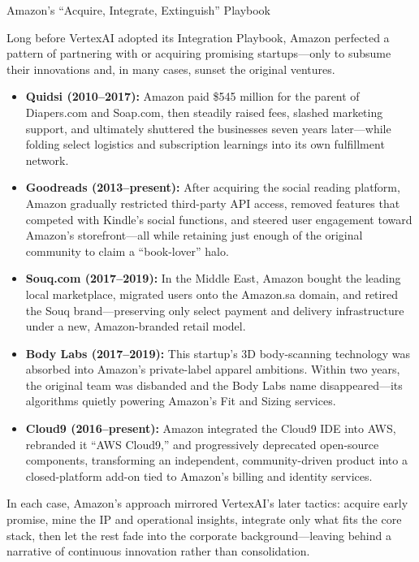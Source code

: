 \begin{HistoricalSidebar}{Amazon’s “Acquire, Integrate, Extinguish” Playbook}

  Long before VertexAI adopted its Integration Playbook, Amazon perfected a pattern of partnering with or acquiring 
  promising startups—only to subsume their innovations and, in many cases, sunset the original ventures.

  \medskip
  
  \begin{itemize}

    \item \textbf{Quidsi (2010–2017):}  Amazon paid \$545 million for the parent of Diapers.com and Soap.com, then 
    steadily raised fees, slashed marketing support, and ultimately shuttered the businesses seven years later—while 
    folding select logistics and subscription learnings into its own fulfillment network.

    \medskip

    \item \textbf{Goodreads (2013–present):}  After acquiring the social reading platform, Amazon gradually restricted 
    third-party API access, removed features that competed with Kindle’s social functions, and steered user engagement 
    toward Amazon’s storefront—all while retaining just enough of the original community to claim a “book-lover” halo.

    \medskip

    \item \textbf{Souq.com (2017–2019):}  In the Middle East, Amazon bought the leading local marketplace, migrated 
    users onto the Amazon.sa domain, and retired the Souq brand—preserving only select payment and delivery 
    infrastructure under a new, Amazon-branded retail model.

    \medskip

    \item \textbf{Body Labs (2017–2019):}  This startup’s 3D body-scanning technology was absorbed into Amazon’s 
    private-label apparel ambitions.  Within two years, the original team was disbanded and the Body Labs name 
    disappeared—its algorithms quietly powering Amazon’s Fit and Sizing services.

    \medskip

    \item \textbf{Cloud9 (2016–present):}  Amazon integrated the Cloud9 IDE into AWS, rebranded it “AWS Cloud9,” and 
    progressively deprecated open-source components, transforming an independent, community-driven product into a 
    closed-platform add-on tied to Amazon’s billing and identity services.

  \end{itemize}

  \medskip
  
  In each case, Amazon’s approach mirrored VertexAI’s later tactics: acquire early promise, mine the IP and 
  operational insights, integrate only what fits the core stack, then let the rest fade into the corporate 
  background—leaving behind a narrative of continuous innovation rather than consolidation.  

\end{HistoricalSidebar}

